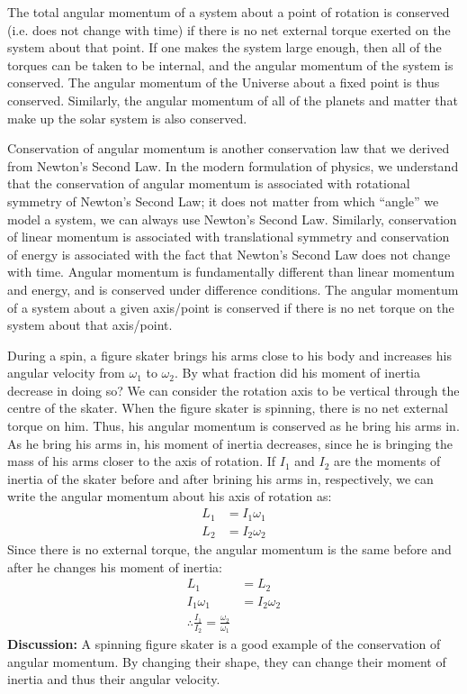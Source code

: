 The total angular momentum of a system about a point of rotation is conserved (i.e. does not change with time) if there is no net external torque exerted on the system about that point. If one makes the system large enough, then all of the torques can be taken to be internal, and the angular momentum of the system is conserved. The angular momentum of the Universe about a fixed point is thus conserved. Similarly, the angular momentum of all of the planets and matter that make up the solar system is also conserved.

Conservation of angular momentum is another conservation law that we derived from Newton's Second Law. In the modern formulation of physics, we understand that the conservation of angular momentum is associated with rotational symmetry of Newton's Second Law; it does not matter from which ``angle'' we model a system, we can always use Newton's Second Law. Similarly, conservation of linear momentum is associated with translational symmetry and conservation of energy is associated with the fact that Newton's Second Law does not change with time. Angular momentum is fundamentally different than linear momentum and energy, and is conserved under difference conditions. The angular momentum of a system about a given axis/point is conserved if there is no net torque on the system about that axis/point.


\begin{example}{During a spin, a figure skater brings his arms close to his body and increases his angular velocity from $\omega_1$ to $\omega_2$. By what fraction did his moment of inertia decrease in doing so?}
We can consider the rotation axis to be vertical through the centre of the skater. When the figure skater is spinning, there is no net external torque on him. Thus, his angular momentum is conserved as he bring his arms in. As he bring his arms in, his moment of inertia decreases, since he is bringing the mass of his arms closer to the axis of rotation. If $I_1$ and $I_2$ are the moments of inertia of the skater before and after brining his arms in, respectively, we can write the angular momentum about his axis of rotation as:
\begin{align*}
L_1 &= I_1\omega_1\\
L_2 &= I_2\omega_2
\end{align*}
Since there is no external torque, the angular momentum is the same before and after he changes his moment of inertia:
\begin{align*}
L_1 &= L_2\\
I_1\omega_1 &= I_2\omega_2\\
\therefore \frac{I_1}{I_2} = \frac{\omega_2}{\omega_1}
\end{align*}
\textbf{Discussion:} A spinning figure skater is a good example of the conservation of angular momentum. By changing their shape, they can change their moment of inertia and thus their angular velocity. 
\end{example}

